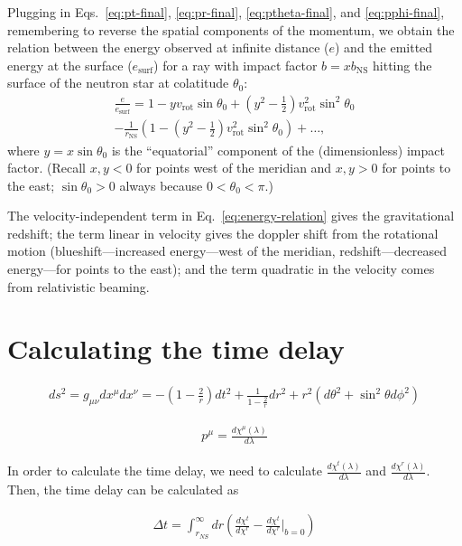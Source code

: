 \documentclass[modern]{aastex631}
\newcommand{\bNS}{b_\mathrm{NS}}
\newcommand{\rNS}{r_\mathrm{NS}}
\newcommand{\vRot}{v_\mathrm{rot}}
\begin{document}
Plugging in Eqs.\ \eqref{eq:pt-final}, \eqref{eq:pr-final},
\eqref{eq:ptheta-final}, and \eqref{eq:pphi-final}, remembering to reverse the
spatial components of the momentum, we obtain the relation between the energy
observed at infinite distance ($e$) and the emitted energy at the surface
($e_\mathrm{surf}$) for a ray with impact factor $b = x \bNS$ hitting the
surface of the neutron star at colatitude $\theta_0$:
\begin{multline}
    \label{eq:energy-relation}
    \frac{e}{e_\mathrm{surf}} = 1 - y \vRot \sin \theta_0 + \left( y^2 - \frac{1}{2} \right) \vRot^2 \sin^2 \theta_0 \\ 
    - \frac{1}{\rNS} \left( 1 - \left( y^2 - \frac{1}{2} \right) \vRot^2 \sin^2 \theta_0 \right) + \ldots, 
\end{multline}
where $y = x \sin \theta_0$ is the ``equatorial'' component of the
(dimensionless) impact factor.  (Recall $x, y < 0$ for points west of the
meridian and $x, y > 0$ for points to the east; $\sin \theta_0 > 0$ always
because $0 < \theta_0 < \pi$.)

The velocity-independent term in Eq.\ \eqref{eq:energy-relation} gives the
gravitational redshift; the term linear in velocity gives the doppler shift from
the rotational motion (blueshift---increased energy---west of the meridian,
redshift---decreased energy---for points to the east); and the term quadratic in
the velocity comes from relativistic beaming.

\section{Calculating the time delay}
%
\begin{linenomath}\begin{align}
    \label{eq:geodesic}
    ds^2 = g_{\mu\nu}dx^\mu dx^\nu = -(1-\frac{2}{r})dt^2 + \frac{1}{1-\frac{2}{r}}dr^2 + r^2(d\theta^2+\sin^2 \theta d\phi^2)
\end{align}\end{linenomath}
%
\begin{linenomath}\begin{align}
    \label{eq:momentum}
    p^\mu = \frac{d\chi^\mu(\lambda)}{d\lambda}
\end{align}\end{linenomath}
%

In order to calculate the time delay, we need to calculate $\frac{d\chi^t(\lambda)}{d\lambda}$ and $\frac{d\chi^r(\lambda)}{d\lambda}$. Then, the time delay
can be calculated as 
%
\begin{linenomath}\begin{align}
    \label{eq:timedelay}
    \Delta t = \int_{r_{NS}}^{\infty} dr \left(\frac{d\chi^t}{d\chi^r} - \frac{d\chi^t}{d\chi^r}\vert_{b=0} \right)
\end{align}\end{linenomath}
%
\end{document}
